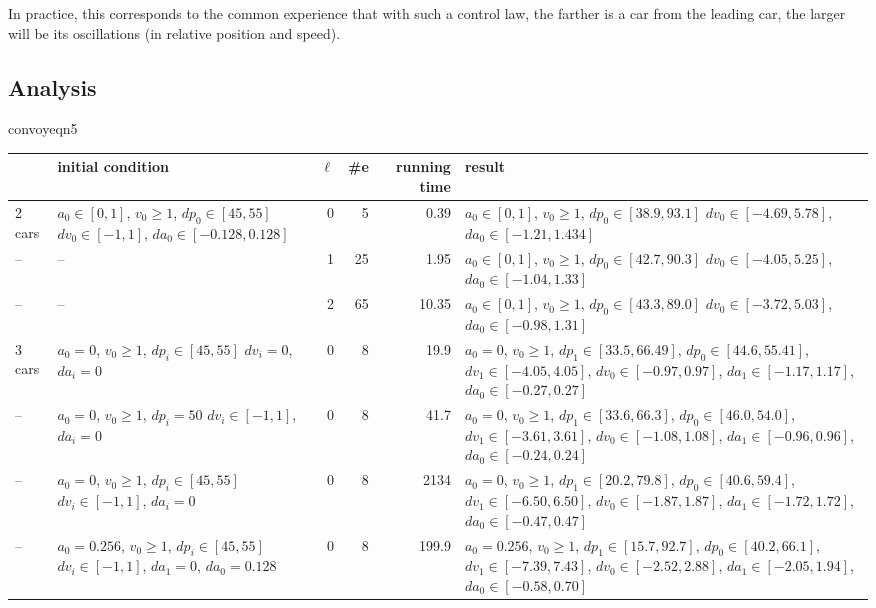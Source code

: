 \documentclass[a4paper,11pt]{article}
\begin{document}
In practice, this corresponds to the common experience that with
such a control law, the farther is a car from the leading car, the
larger will be its oscillations (in relative position and speed).

\subsection{Analysis}

\begin{center}
\begin{gif}[][130][130]{convoyeqn5}\boldmath
\begin{tabular}{|l|p{10em}|rrr|p{10em}|}
\hline
& initial condition & $\ell$ & \#e & running time & result \\ \hline
2 cars &
$a_0\in[0,1]$, $v_0\geq1$, $\mathit{dp}_0\in[45,55]$
$\mathit{dv}_0\in[-1,1]$, $\mathit{da}_0\in[-0.128,0.128]$ &
0 & 5 & 0.39 &
$a_0 \in [0,1]$, $v_0\geq1$, $\mathit{dp}_0\in[38.9,93.1]$
$\mathit{dv}_0\in[-4.69,5.78]$, $
\mathit{da}_0\in[-1.21,1.434]$ \\
-- & -- & 1 & 25 & 1.95 &
$a_0\in[0,1]$, $v_0\geq1$, $\mathit{dp}_0\in[42.7,90.3]$
$\mathit{dv}_0\in[-4.05,5.25]$, $\mathit{da}_0\in[-1.04,1.33]$ \\
-- & -- & 2 & 65 & 10.35 &
$a_0\in[0,1]$, $v_0\geq1$, $\mathit{dp}_0\in[43.3,89.0]$
 $\mathit{dv}_0\in[-3.72,5.03]$, $\mathit{da}_0\in[-0.98,1.31]$ \\
\hline
3 cars &
$a_0=0$, $v_0\geq1$, $\mathit{dp}_i\in[45,55]$
$\mathit{dv}_i=0$, $\mathit{da}_i=0$ &
0 & 8 & 19.9 &
$a_0=0$, $v_0\geq1$, $\mathit{dp}_1\in[33.5,66.49]$, $\mathit{dp}_0\in[44.6,55.41]$,
$\mathit{dv}_1\in[-4.05,4.05]$, $\mathit{dv}_0\in[-0.97,0.97]$,
$\mathit{da}_1\in[-1.17,1.17]$, $\mathit{da}_0\in[-0.27,0.27]$ \\
-- &
$a_0=0$, $v_0\geq1$, $\mathit{dp}_i=50$
$\mathit{dv}_i\in[-1,1]$, $\mathit{da}_i=0$ &
0 & 8 & 41.7 &
$a_0=0$, $v_0\geq1$, $\mathit{dp}_1\in[33.6,66.3]$, $\mathit{dp}_0\in[46.0,54.0]$,
$\mathit{dv}_1\in[-3.61,3.61]$, $\mathit{dv}_0\in[-1.08,1.08]$,
$\mathit{da}_1\in[-0.96,0.96]$, $\mathit{da}_0\in[-0.24,0.24]$ \\
-- &
$a_0=0$, $v_0\geq1$, $\mathit{dp}_i\in[45,55]$
$\mathit{dv}_i\in[-1,1]$, $\mathit{da}_i=0$ &
0 & 8 & 2134 &
$a_0=0$, $v_0\geq1$, $\mathit{dp}_1\in[20.2,79.8]$, $\mathit{dp}_0\in[40.6,59.4]$,
$\mathit{dv}_1\in[-6.50,6.50]$, $\mathit{dv}_0\in[-1.87,1.87]$,
$\mathit{da}_1\in[-1.72,1.72]$, $\mathit{da}_0\in[-0.47,0.47]$ \\
-- &
$a_0=0.256$, $v_0\geq1$, $\mathit{dp}_i\in[45,55]$
$\mathit{dv}_i\in[-1,1]$, $\mathit{da}_1=0$, $\mathit{da}_0=0.128$ &
0 & 8 & 199.9 &
$a_0=0.256$, $v_0\geq1$, $\mathit{dp}_1\in[15.7,92.7]$, $\mathit{dp}_0\in[40.2,66.1]$,
$\mathit{dv}_1\in[-7.39,7.43]$, $\mathit{dv}_0\in[-2.52,2.88]$,
$\mathit{da}_1\in[-2.05,1.94]$, $\mathit{da}_0\in[-0.58,0.70]$ \\
\hline
\end{tabular}
\end{gif}
\end{center}
\end{document}

